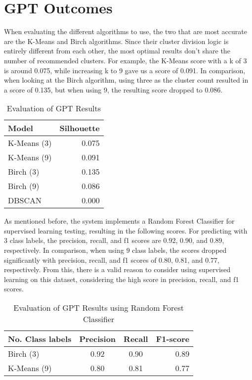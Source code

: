 \chapter{GPT Outcomes}
\label{ch:gpt_outcomes}

When evaluating the different algorithms to use, the two that are most accurate are the K-Means and Birch algorithms. Since their cluster division logic is entirely different from each other, the most optimal results don't share the number of recommended clusters. For example, the K-Means score with a k of 3 is around 0.075, while increasing k to 9 gave us a score of 0.091. In comparison, when looking at the Birch algorithm, using three as the cluster count resulted in a score of 0.135, but when using 9, the resulting score dropped to 0.086.

\begin{table}
  \centering
  \label{tab:gpt_outcomes}
  \begin{tabular}{ | l | r | }
    \hline
    \textbf{Model} & \textbf{Silhouette} \\
    \hline
    K-Means (3) & 0.075 \\
    \hline
    K-Means (9) & 0.091 \\
    \hline
    Birch (3) & 0.135 \\
    \hline
    Birch (9) & 0.086 \\
    \hline
    DBSCAN & 0.000 \\
    \hline
  \end{tabular}
  \caption{Evaluation of GPT Results}
\end{table}

As mentioned before, the system implements a Random Forest Classifier for supervised learning testing, resulting in the following scores. For predicting with 3 class labels, the precision, recall, and f1 scores are 0.92, 0.90, and 0.89, respectively. In comparison, when using 9 class labels, the scores dropped significantly with precision, recall, and f1 scores of 0.80, 0.81, and 0.77, respectively. From this, there is a valid reason to consider using supervised learning on this dataset, considering the high score in precision, recall, and f1 scores. 

\begin{table}
  \centering
  \label{tab:rf_outcomes}
  \begin{tabular}{ | l | c | c | r | }
    \hline
    \textbf{No. Class labels} & \textbf{Precision} & \textbf{Recall} & \textbf{F1-score} \\
    \hline
    Birch (3) & 0.92 & 0.90 & 0.89 \\
    \hline
    K-Means (9) & 0.80 & 0.81 & 0.77 \\
    \hline
  \end{tabular}
  \caption{Evaluation of GPT Results using Random Forest Classifier}
\end{table}


